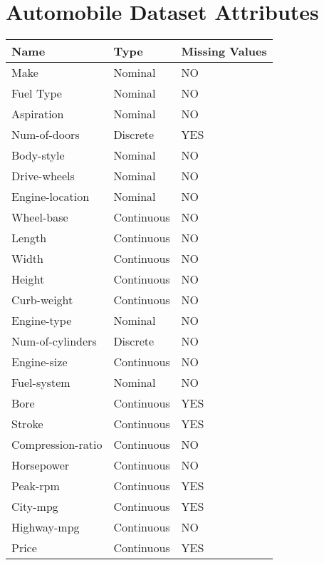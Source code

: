 \appendix
\chapter{Automobile Dataset Attributes}\label{attributes}
\begin{tabularx}{\textwidth}{|X|l|l|}
	\hline
	\textbf{Name}     & \textbf{Type} & \textbf{Missing Values} \\
	\hline
	Make              & Nominal       & NO                      \\
	Fuel Type         & Nominal       & NO                      \\
	Aspiration        & Nominal       & NO                      \\
	Num-of-doors      & Discrete      & YES                     \\
	Body-style        & Nominal       & NO                      \\
	Drive-wheels      & Nominal       & NO                      \\
	Engine-location   & Nominal       & NO                      \\
	Wheel-base        & Continuous    & NO                      \\
	Length            & Continuous    & NO                      \\
	Width             & Continuous    & NO                      \\
	Height            & Continuous    & NO                      \\
	Curb-weight       & Continuous    & NO                      \\
	Engine-type       & Nominal       & NO                      \\
	Num-of-cylinders  & Discrete      & NO                      \\
	Engine-size       & Continuous    & NO                      \\
	Fuel-system       & Nominal       & NO                      \\
	Bore              & Continuous    & YES                     \\
	Stroke            & Continuous    & YES                     \\
	Compression-ratio & Continuous    & NO                      \\
	Horsepower        & Continuous    & NO                      \\
	Peak-rpm          & Continuous    & YES                     \\
	City-mpg          & Continuous    & YES                     \\
	Highway-mpg       & Continuous    & NO                      \\
	Price             & Continuous    & YES                     \\
	\hline
\end{tabularx}